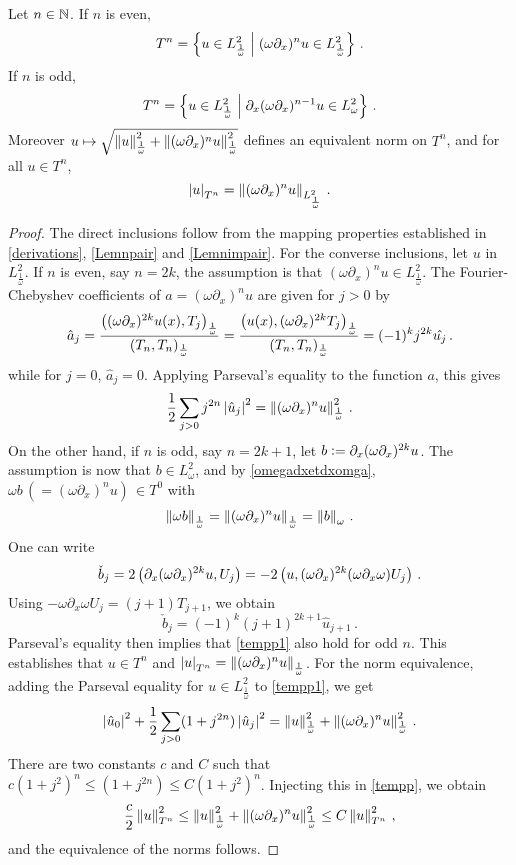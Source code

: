 \documentclass[a4paper]{article}
\begin{document}
\begin{Lem}
	Let $n \in \mathbb{N}$. If $n$ is even,
	\[T^n = \left\{ u \in L^2_\frac{1}{\omega}\mathrel{}\middle|\mathrel{}(\omega \partial_x)^n u \in L^2_\frac{1}{\omega}\right\}\,.\]
	If $n$ is odd, 
	\[T^n = \left\{u \in L^2_\frac{1}{\omega}\mathrel{}\middle|\mathrel{}\partial_x(\omega \partial_x)^{n-1} u \in L^2_\omega\right\}\,.\] 
	Moreover $u \mapsto \sqrt{\left\|u\right\|_\frac{1}{\omega}^2 + \left\|(\omega \partial_x)^nu\right\|^2_{\frac{1}{\omega}}}$ defines an equivalent norm on $T^n$, and for all $u \in T^n$, 
	\[\left\lvert u \right\rvert_{T^n} = \left\|(\omega \partial_x)^n u\right\|_{L^2_\frac{1}{\omega}}\,.\]
	\label{LemEquivalentNormsTn}
\end{Lem}
\begin{proof}
	The direct inclusions follow from the mapping properties established in \autoref{derivations}, \autoref{Lemnpair} and \autoref{Lemnimpair}. 
	For the converse inclusions, let $u$ in $L^2_\frac{1}{\omega}$. If $n$ is even, say $n=2k$, the assumption is that $(\omega \partial_x)^{n}u \in L^2_\frac{1}{\omega}$. The Fourier-Chebyshev coefficients of $a = (\omega \partial_x)^n u$ are given for $j > 0$ by
	\[\hat{a}_j = \frac{\left( (\omega \partial_x)^{2k} u(x),T_j\right)_\frac{1}{\omega}}{(T_n,T_n)_\frac{1}{\omega}} =  \frac{\left(  u(x),(\omega \partial_x)^{2k}T_j\right)_\frac{1}{\omega}}{(T_n,T_n)_\frac{1}{\omega}} = (-1)^k j^{2k} \hat{u_j}\,.\]
	while for $j = 0$, $\hat{a}_j = 0$. 
	Applying Parseval's equality to the function $a$, this gives
	\begin{equation}
	\label{tempp1}
	\frac{1}{2}\sum_{j > 0} j^{2n} \left\lvert \hat{u}_j \right\rvert^2 = \left\|(\omega \partial_x)^n u\right\|_\frac{1}{\omega}^2\,.
	\end{equation}
	On the other hand, if $n$ is odd, say $n = 2k+1$, let $b \mathrel{\mathop:}= \partial_x (\omega \partial_x)^{2k} u$. The assumption is now that $b \in L^2_\omega$, and by \autoref{omegadxetdxomga}, $\omega b \, ( = (\omega \partial_x)^n u) \, \in T^0$ with
	\[\left\|\omega b\right\|_{\frac{1}{\omega}} = \left\|(\omega \partial_x)^n u\right\|_{\frac{1}{\omega}} =  \left\|b\right\|_\omega\,.\]
	One can write
	\[\check{b}_j = 2\left( \partial_x(\omega \partial_x)^{2k} u,U_j\right) = -2 \left( u,(\omega \partial_x)^{2k}(\omega \partial_x \omega) U_j\right)\,.\]
	Using $-\omega \partial_x \omega U_j = (j+1)T_{j+1}$, we obtain
	\[\check{b}_j = (-1)^k(j+1)^{2k + 1} \hat{u}_{j+1}\,.\]
	Parseval's equality then implies that \eqref{tempp1} also hold for odd $n$.
	This establishes that $u \in T^n$ and $\left\lvert u \right\rvert_{T^n} = \left\|(\omega \partial_x)^nu\right\|_\frac{1}{\omega}$. For the norm equivalence, adding the Parseval equality for $u \in L^2_\frac{1}{\omega}$ to \cref{tempp1}, we get 
	\begin{equation}
	\left\lvert \hat{u}_0 \right\rvert^2 + \frac{1}{2}\sum_{j > 0}  (1 + j^{2n}) \left\lvert \hat{u}_j \right\rvert^2 = \left\|u\right\|_\frac{1}{\omega}^2 + \left\|(\omega \partial_x)^n u\right\|_\frac{1}{\omega}^2\,.
	\label{tempp}
	\end{equation}
	There are two constants $c$ and $C$ such that $c (1 + j^2)^n \leq (1 + j^{2n}) \leq C(1 + j^2)^n$. Injecting this in \eqref{tempp}, we obtain
	\[ \frac{c}{2}\left\|u\right\|_{T^n}^2 \leq  \left\|u\right\|_\frac{1}{\omega}^2 + \left\|(\omega \partial_x)^n u\right\|_\frac{1}{\omega}^2\leq C\left\|u\right\|_{T^n}^2\,,\] 
	and the equivalence of the norms follows.
\end{proof}
\end{document}
